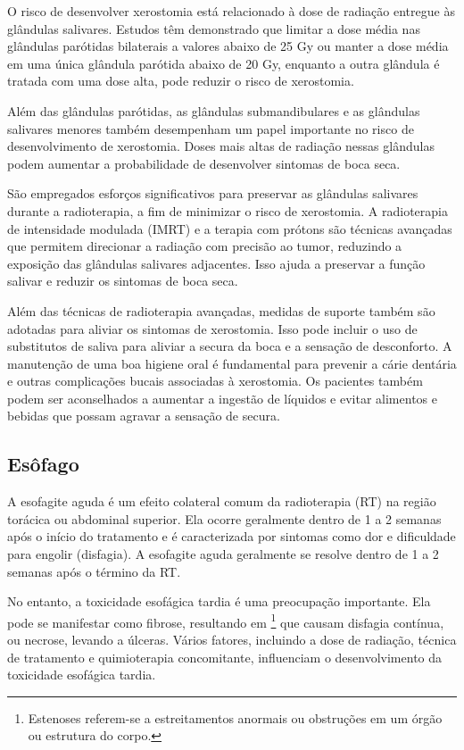 \documentclass[11pt,a4paper]{article}
\begin{document}
	O risco de desenvolver xerostomia está relacionado à dose de radiação entregue às glândulas salivares. Estudos têm demonstrado que limitar a dose média nas glândulas parótidas bilaterais a valores abaixo de 25 Gy ou manter a dose média em uma única glândula parótida abaixo de 20 Gy, enquanto a outra glândula é tratada com uma dose alta, pode reduzir o risco de xerostomia.

	Além das glândulas parótidas, as glândulas submandibulares e as glândulas salivares menores também desempenham um papel importante no risco de desenvolvimento de xerostomia. Doses mais altas de radiação nessas glândulas podem aumentar a probabilidade de desenvolver sintomas de boca seca.

	São empregados esforços significativos para preservar as glândulas salivares durante a radioterapia, a fim de minimizar o risco de xerostomia. A radioterapia de intensidade modulada (IMRT) e a terapia com prótons são técnicas avançadas que permitem direcionar a radiação com precisão ao tumor, reduzindo a exposição das glândulas salivares adjacentes. Isso ajuda a preservar a função salivar e reduzir os sintomas de boca seca.

	Além das técnicas de radioterapia avançadas, medidas de suporte também são adotadas para aliviar os sintomas de xerostomia. Isso pode incluir o uso de substitutos de saliva para aliviar a secura da boca e a sensação de desconforto. A manutenção de uma boa higiene oral é fundamental para prevenir a cárie dentária e outras complicações bucais associadas à xerostomia. Os pacientes também podem ser aconselhados a aumentar a ingestão de líquidos e evitar alimentos e bebidas que possam agravar a sensação de secura.

\subsection*{Esôfago}

	A esofagite aguda é um efeito colateral comum da radioterapia (RT) na região torácica ou abdominal superior. Ela ocorre geralmente dentro de 1 a 2 semanas após o início do tratamento e é caracterizada por sintomas como dor e dificuldade para engolir (disfagia). A esofagite aguda geralmente se resolve dentro de 1 a 2 semanas após o término da RT.

	No entanto, a toxicidade esofágica tardia é uma preocupação importante. Ela pode se manifestar como fibrose, resultando em \footnote{Estenoses referem-se a estreitamentos anormais ou obstruções em um órgão ou estrutura do corpo.} que causam disfagia contínua, ou necrose, levando a úlceras. Vários fatores, incluindo a dose de radiação, técnica de tratamento e quimioterapia concomitante, influenciam o desenvolvimento da toxicidade esofágica tardia.
\end{document}
